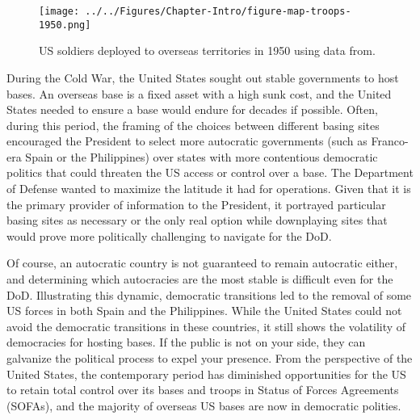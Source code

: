 \begin{figure}[t]
	\centering\texttt{[image: ../../Figures/Chapter-Intro/figure-map-troops-1950.png]}
	\caption{US soldiers deployed to overseas territories in 1950 using data from.\autocite{Kane2004}}
	\label{fig:intromap1}
\end{figure}


During the Cold War, the United States sought out stable governments to host bases. An overseas base is a fixed asset with a high sunk cost, and the United States needed to ensure a base would endure for decades if possible.  Often, during this period, the framing of the choices between different basing sites encouraged the President to select more autocratic governments (such as Franco-era Spain or the Philippines) over states with more contentious democratic politics that could threaten the US access or control over a base.\autocite{Halperin2007} The Department of Defense wanted to maximize the latitude it had for operations. Given that it is the primary provider of information to the President, it portrayed particular basing sites as necessary or the only real option while downplaying sites that would prove more politically challenging to navigate for the DoD. 

Of course, an autocratic country is not guaranteed to remain autocratic either, and determining which autocracies are the most stable is difficult even for the DoD. Illustrating this dynamic, democratic transitions led to the removal of some US forces in both Spain and the Philippines.\autocite{Cooley2008} While the United States could not avoid the democratic transitions in these countries, it still shows the volatility of democracies for hosting bases. If the public is not on your side, they can galvanize the political process to expel your presence.  From the perspective of the United States, the contemporary period has diminished opportunities for the US to retain total control over its bases and troops in Status of Forces Agreements (SOFAs), and the majority of overseas US bases are now in democratic polities. 

